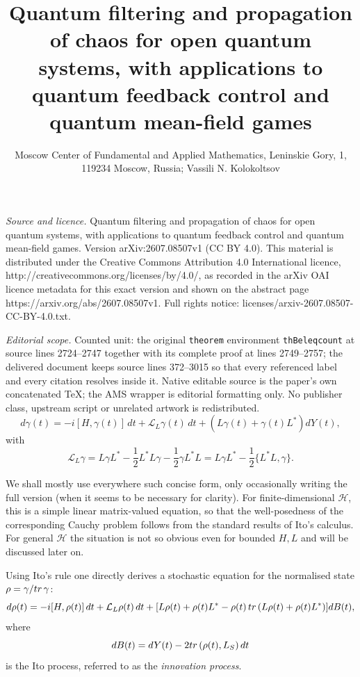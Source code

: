 \documentclass[10pt,a4paper]{amsart}
\def\LC{\mathcal{L}}
\def\HC{\mathcal{H}}
\def\tr{\rm{tr}}
\def\ga{\gamma}
\begin{document}
\title[Quantum filtering and propagation of chaos for open quantum ]{Quantum filtering and propagation of chaos for open quantum systems, with applications to quantum feedback control and quantum mean-field games}
\author{Moscow Center of Fundamental and Applied Mathematics, Leninskie Gory, 1, 119234 Moscow, Russia; Vassili N. Kolokoltsov}
\date{}
\maketitle
\noindent\emph{Source and licence.} Quantum filtering and propagation of chaos for open quantum systems, with applications to quantum feedback control and quantum mean-field games. Version arXiv:2607.08507v1 (CC BY 4.0). This material is distributed under the Creative Commons Attribution 4.0 International licence, http://creativecommons.org/licenses/by/4.0/, as recorded in the arXiv OAI licence metadata for this exact version and shown on the abstract page https://arxiv.org/abs/2607.08507v1. Full rights notice: licenses/arxiv-2607.08507-CC-BY-4.0.txt.\par\smallskip
\noindent\textit{Editorial scope.} Counted unit: the original \texttt{theorem} environment \texttt{thBeleqcount} at source lines 2724--2747 together with its complete proof at lines 2749--2757; the delivered document keeps source lines 372--3015 so that every referenced label and every citation resolves inside it. Native editable source is the paper's own concatenated TeX; the AMS wrapper is editorial formatting only. No publisher class, upstream script or unrelated artwork is redistributed.
\begin{equation}
\label{Lindstoch}
d\ga(t)=-i[H,\ga(t)] \, dt +\LC_L \ga(t) \, dt +(L\ga(t)+\ga(t) L^*) dY(t),
\end{equation}
with
\[
\LC_L\ga =L\ga L^*-\frac12 L^*L\ga -\frac12 \ga L^*L
=L\ga L^*-\frac12 \{L^*L,\ga\}.
\]

We shall mostly use everywhere such concise form, only occasionally writing the full version
(when it seems to be necessary for clarity).
For finite-dimensional $\HC$, this is a simple linear matrix-valued equation, so that
the well-posedness of the corresponding Cauchy problem follows from the standard results of Ito's calculus.
For general $\HC$ the situation is not so obvious even for bounded $H,L$ and will be discussed later on.

Using Ito's rule one directly derives a stochastic equation for the normalised state
$\rho=\ga/{\tr} \, \ga$:
\begin{equation}
\label{Lindstochnorm1}
d\rho(t)=-i[H,\rho(t)]\, dt+\LC_L \rho (t)\, dt
+[L\rho(t)+\rho(t) L^*-\rho(t)\, {\tr} \, (L\rho(t)+\rho(t) L^*) ] dB(t),
\end{equation}
where
\begin{equation}
\label{eqdefinnov}
dB(t)=dY(t)-2{\tr} \, (\rho(t), L_S) \, dt
\end{equation}
is the Ito process, referred to as the {\it innovation process}.
\end{document}
